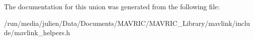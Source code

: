 The documentation for this union was generated from the following file\+:\begin{DoxyCompactItemize}
\item 
/run/media/julien/\+Data/\+Documents/\+M\+A\+V\+R\+I\+C/\+M\+A\+V\+R\+I\+C\+\_\+\+Library/mavlink/include/mavlink\+\_\+helpers.\+h\end{DoxyCompactItemize}
